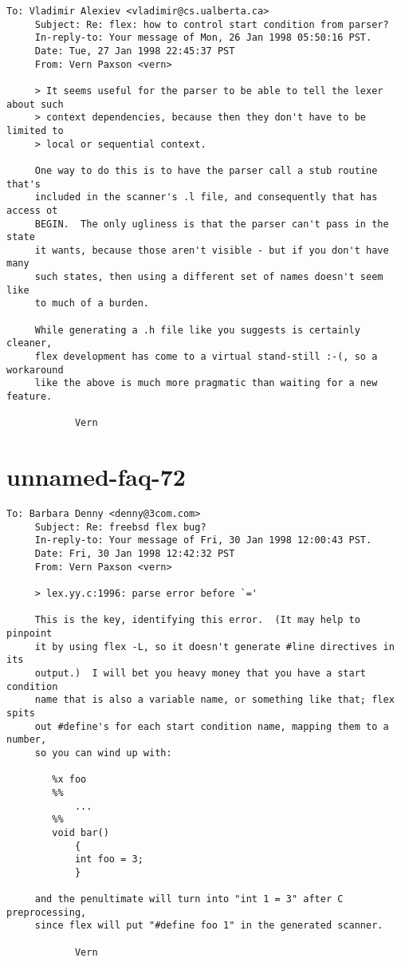 \documentclass[openany,oneside]{book}
\begin{document}
\begin{verbatim}
To: Vladimir Alexiev <vladimir@cs.ualberta.ca>
     Subject: Re: flex: how to control start condition from parser?
     In-reply-to: Your message of Mon, 26 Jan 1998 05:50:16 PST.
     Date: Tue, 27 Jan 1998 22:45:37 PST
     From: Vern Paxson <vern>
     
     > It seems useful for the parser to be able to tell the lexer about such
     > context dependencies, because then they don't have to be limited to
     > local or sequential context.
     
     One way to do this is to have the parser call a stub routine that's
     included in the scanner's .l file, and consequently that has access ot
     BEGIN.  The only ugliness is that the parser can't pass in the state
     it wants, because those aren't visible - but if you don't have many
     such states, then using a different set of names doesn't seem like
     to much of a burden.
     
     While generating a .h file like you suggests is certainly cleaner,
     flex development has come to a virtual stand-still :-(, so a workaround
     like the above is much more pragmatic than waiting for a new feature.
     
     		Vern
\end{verbatim}

\section{unnamed-faq-72}

\begin{verbatim}
To: Barbara Denny <denny@3com.com>
     Subject: Re: freebsd flex bug?
     In-reply-to: Your message of Fri, 30 Jan 1998 12:00:43 PST.
     Date: Fri, 30 Jan 1998 12:42:32 PST
     From: Vern Paxson <vern>
     
     > lex.yy.c:1996: parse error before `='
     
     This is the key, identifying this error.  (It may help to pinpoint
     it by using flex -L, so it doesn't generate #line directives in its
     output.)  I will bet you heavy money that you have a start condition
     name that is also a variable name, or something like that; flex spits
     out #define's for each start condition name, mapping them to a number,
     so you can wind up with:
     
     	%x foo
     	%%
     		...
     	%%
     	void bar()
     		{
     		int foo = 3;
     		}
     
     and the penultimate will turn into "int 1 = 3" after C preprocessing,
     since flex will put "#define foo 1" in the generated scanner.
     
     		Vern
\end{verbatim}
\end{document}
